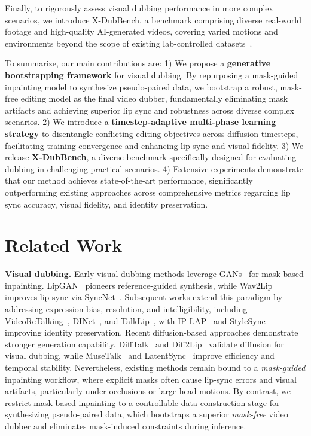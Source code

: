 \documentclass{article}
\newcommand{\benchname}{X-DubBench}
\newcommand{\myparagraph}[1]{\noindent\textbf{#1}}
\theoremstyle{plain}
\theoremstyle{definition}
\theoremstyle{remark}
\begin{document}
Finally, to rigorously assess visual dubbing performance in more complex scenarios, we introduce \benchname{}, a benchmark comprising diverse real-world footage and high-quality AI-generated videos, covering varied motions and environments beyond the scope of existing lab-controlled datasets~\citep{afouras2018LRS,zhang2021hdtf}.


To summarize, our main contributions are: 
1) We propose a \textbf{generative bootstrapping framework} for visual dubbing. 
By repurposing a mask-guided inpainting model to synthesize pseudo-paired data, we bootstrap a robust, mask-free editing model as the final video dubber, fundamentally eliminating mask artifacts and achieving superior lip sync and robustness across diverse complex scenarios.
2) We introduce a \textbf{timestep-adaptive multi-phase learning strategy} to disentangle conflicting editing objectives across diffusion timesteps, facilitating training convergence and enhancing lip sync and visual fidelity.
3) We release \textbf{\benchname{}}, a diverse benchmark specifically designed for evaluating dubbing in challenging practical scenarios.
4) Extensive experiments demonstrate that our method achieves state-of-the-art performance, significantly outperforming existing approaches across comprehensive metrics regarding lip sync accuracy, visual fidelity, and identity preservation.

\section{Related Work}
\myparagraph{Visual dubbing.}
Early visual dubbing methods leverage GANs~\citep{goodfellow2014generative} for mask-based inpainting.
LipGAN~\citep{kr2019lipgan} pioneers reference-guided synthesis, while Wav2Lip~\citep{prajwal2020wav2lip} improves lip sync via SyncNet~\citep{chung2016syncnet}.
Subsequent works extend this paradigm by addressing expression bias, resolution, and intelligibility, including VideoReTalking~\citep{cheng2022videoretalking}, DINet~\citep{zhang2023dinet}, and TalkLip~\citep{wang2023talklip}, with IP-LAP~\citep{zhong2023iplap} and StyleSync~\citep{guan2023stylesync} improving identity preservation.
Recent diffusion-based approaches demonstrate stronger generation capability.
DiffTalk~\citep{shen2023difftalk} and Diff2Lip~\citep{mukhopadhyay2024diff2lip} validate diffusion for visual dubbing, while MuseTalk~\citep{zhang2024musetalk} and LatentSync~\citep{li2024latentsync} improve efficiency and temporal stability.
Nevertheless, existing methods remain bound to a \textit{mask-guided} inpainting workflow, where explicit masks often cause lip-sync errors and visual artifacts, particularly under occlusions or large head motions.
By contrast, we restrict mask-based inpainting to a controllable data construction stage for synthesizing pseudo-paired data, which bootstraps a superior \textit{mask-free} video dubber and eliminates mask-induced constraints during inference.
\end{document}
